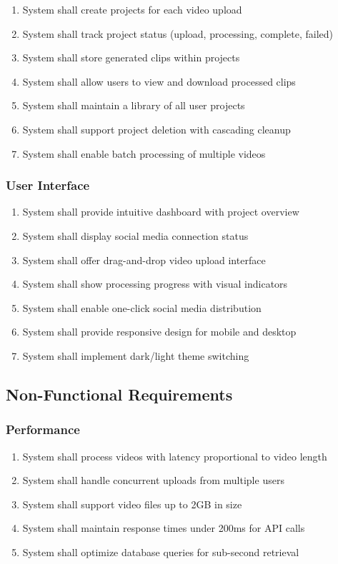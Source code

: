 \begin{enumerate}[label=FR4.\arabic*]
    \item System shall create projects for each video upload
    \item System shall track project status (upload, processing, complete, failed)
    \item System shall store generated clips within projects
    \item System shall allow users to view and download processed clips
    \item System shall maintain a library of all user projects
    \item System shall support project deletion with cascading cleanup
    \item System shall enable batch processing of multiple videos
\end{enumerate}

\subsubsection{User Interface}

\begin{enumerate}[label=FR5.\arabic*]
    \item System shall provide intuitive dashboard with project overview
    \item System shall display social media connection status
    \item System shall offer drag-and-drop video upload interface
    \item System shall show processing progress with visual indicators
    \item System shall enable one-click social media distribution
    \item System shall provide responsive design for mobile and desktop
    \item System shall implement dark/light theme switching
\end{enumerate}

\subsection{Non-Functional Requirements}

\subsubsection{Performance}

\begin{enumerate}[label=NFR1.\arabic*]
    \item System shall process videos with latency proportional to video length
    \item System shall handle concurrent uploads from multiple users
    \item System shall support video files up to 2GB in size
    \item System shall maintain response times under 200ms for API calls
    \item System shall optimize database queries for sub-second retrieval
\end{enumerate}

